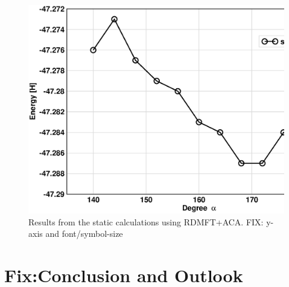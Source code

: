 \documentclass[%
 reprint,
nofootinbib,
 amsmath,amssymb,
 aps,
]{revtex4-2}
\begin{document}
\begin{figure}
    \centering
    \includegraphics[width=\columnwidth]{sciresults.eps}
    \caption{Results from the static calculations using RDMFT+ACA. FIX: y-axis and font/symbol-size}
    \label{sciresults}
\end{figure}

\section{Fix:Conclusion and Outlook}
\end{document}
